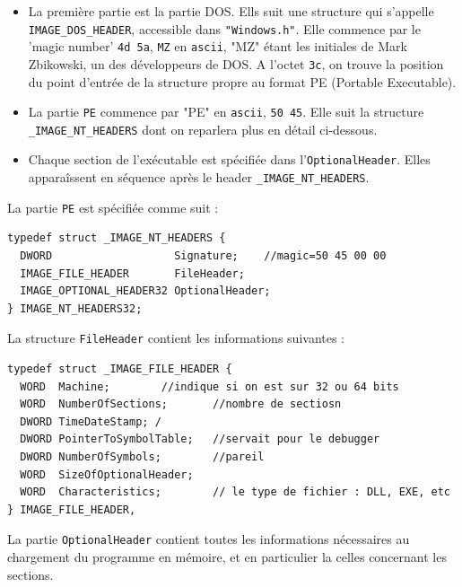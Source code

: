 \documentclass{book}
\newcommand{\code}[1]{\texttt{#1}}
\newcommand{\Windows}{{\sc windows}}
\begin{document}

\begin{itemize}
	\item La première partie est la partie DOS. Ells suit une structure qui s'appelle \code{IMAGE\_DOS\_HEADER}, accessible dans \code{"Windows.h"}. Elle commence par le 'magic number' \code{4d 5a}, \code{MZ} en \code{ascii}, "MZ" étant les initiales de Mark Zbikowski, un des développeurs de DOS.  A l'octet \code{3c}, on trouve la position du point d'entrée de la structure propre au format PE (Portable Executable).
	\item La partie \code{PE} commence par "PE" en \code{ascii}, \code{50 45}. Elle suit la structure \code{\_IMAGE\_NT\_HEADERS} dont on reparlera plus en détail ci-dessous.
	\item Chaque section de l'exécutable est spécifiée dans l'\code{OptionalHeader}. Elles apparaîssent en séquence après le header \code{\_IMAGE\_NT\_HEADERS}. 
\end{itemize}

La partie \code{PE} est spécifiée comme suit : %
\begin{verbatim}
typedef struct _IMAGE_NT_HEADERS {
  DWORD                   Signature;	//magic=50 45 00 00
  IMAGE_FILE_HEADER       FileHeader;	
  IMAGE_OPTIONAL_HEADER32 OptionalHeader;
} IMAGE_NT_HEADERS32;
\end{verbatim} 

 La structure \code{FileHeader} contient les informations suivantes : 

\begin{verbatim}
typedef struct _IMAGE_FILE_HEADER {
  WORD  Machine;		//indique si on est sur 32 ou 64 bits
  WORD  NumberOfSections;       //nombre de sectiosn
  DWORD TimeDateStamp; /
  DWORD PointerToSymbolTable;   //servait pour le debugger
  DWORD NumberOfSymbols;        //pareil
  WORD  SizeOfOptionalHeader;
  WORD  Characteristics;        // le type de fichier : DLL, EXE, etc
} IMAGE_FILE_HEADER,
\end{verbatim}

La partie \code{OptionalHeader} contient toutes les informations nécessaires au chargement du programme en mémoire, et en particulier la celles concernant les sections. 
\end{document}
